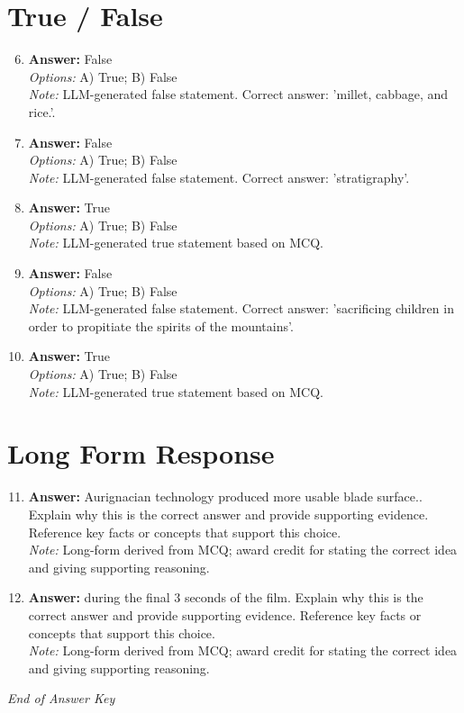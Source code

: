 \documentclass[12pt]{article}
\begin{document}
\section*{True / False}
\begin{enumerate}[label=\arabic*.]
\setcounter{enumi}{5}
\item \textbf{Answer:} False
\\ \textit{Options:} A) True; B) False
\\ \textit{Note:} LLM-generated false statement. Correct answer: 'millet, cabbage, and rice.'.
\item \textbf{Answer:} False
\\ \textit{Options:} A) True; B) False
\\ \textit{Note:} LLM-generated false statement. Correct answer: 'stratigraphy'.
\item \textbf{Answer:} True
\\ \textit{Options:} A) True; B) False
\\ \textit{Note:} LLM-generated true statement based on MCQ.
\item \textbf{Answer:} False
\\ \textit{Options:} A) True; B) False
\\ \textit{Note:} LLM-generated false statement. Correct answer: 'sacrificing children in order to propitiate the spirits of the mountains'.
\item \textbf{Answer:} True
\\ \textit{Options:} A) True; B) False
\\ \textit{Note:} LLM-generated true statement based on MCQ.
\end{enumerate}

\section*{Long Form Response}
\begin{enumerate}[label=\arabic*.]
\setcounter{enumi}{10}
\item \textbf{Answer:} Aurignacian technology produced more usable blade surface.. Explain why this is the correct answer and provide supporting evidence. Reference key facts or concepts that support this choice.
\\ \textit{Note:} Long-form derived from MCQ; award credit for stating the correct idea and giving supporting reasoning.
\item \textbf{Answer:} during the final 3 seconds of the film. Explain why this is the correct answer and provide supporting evidence. Reference key facts or concepts that support this choice.
\\ \textit{Note:} Long-form derived from MCQ; award credit for stating the correct idea and giving supporting reasoning.
\end{enumerate}

\vfill
\noindent\textit{End of Answer Key}
\end{document}
